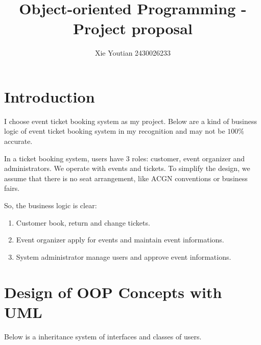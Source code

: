 \documentclass{article}
\title{Object-oriented Programming - Project proposal}
\author{Xie Youtian 2430026233}
\date{}
\begin{document}
\maketitle
\section{Introduction}
I choose event ticket booking system as my project. 
Below are a kind of business logic of event ticket booking system 
in my recognition and may not be $100\%$ accurate.

In a ticket booking system, users have 3 roles: 
customer, event organizer and administrators. 
We operate with events and tickets.
To simplify the design, we assume that there is no seat arrangement, 
like ACGN conventions or business fairs. 

So, the business logic is clear:
\begin{enumerate}
    \item Customer book, return and change tickets.
    \item Event organizer apply for events and maintain event informations.
    \item System administrator manage users and approve event informations.
\end{enumerate}

\section{Design of OOP Concepts with UML}
Below is a inheritance system of interfaces and classes of users.
\end{document}
